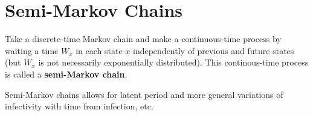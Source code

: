 \section{Semi-Markov Chains}

Take a discrete-time Markov chain and make a continuous-time process by waiting a time $W_x$ in each state $x$ independently of previous and future states (but $W_x$ is not necessarily exponentially distributed). This continous-time process is called a \textbf{\textcolor{myblue}{semi-Markov chain}}.

Semi-Markov chains allows for latent period and more general variations of infectivity with time from infection, etc.